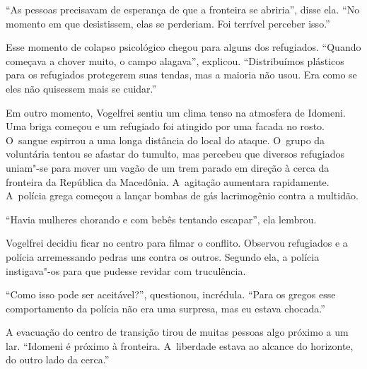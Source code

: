 ``As pessoas precisavam de esperança de que a fronteira se abriria'',
disse ela. ``No momento em que desistissem, elas se perderiam. Foi
terrível perceber isso.''

Esse momento de colapso psicológico chegou para alguns dos refugiados.
``Quando começava a chover muito, o campo alagava'', explicou.
``Distribuímos plásticos para os refugiados protegerem suas tendas, mas
a maioria não usou. Era como se eles não quisessem mais se cuidar.''

Em outro momento, Vogelfrei sentiu um clima tenso na atmosfera de
Idomeni. Uma briga começou e um refugiado foi atingido por uma facada no
rosto. O~sangue espirrou a uma longa distância do local do ataque. 
O~grupo da voluntária tentou se afastar do tumulto, mas percebeu
que diversos refugiados uniam"-se para mover um vagão de um trem parado
em direção à cerca da fronteira da República da Macedônia. A~agitação
aumentara rapidamente. A~polícia grega começou a lançar bombas de gás
lacrimogênio contra a multidão.

``Havia mulheres chorando e com bebês tentando escapar'', ela lembrou.

Vogelfrei decidiu ficar no centro para filmar o conflito. Observou
refugiados e a polícia arremessando pedras uns contra os outros. Segundo ela, a polícia instigava"-os para que pudesse revidar com truculência.

``Como isso pode ser aceitável?'', questionou, incrédula. ``Para os
gregos esse comportamento da polícia não era uma surpresa, mas eu estava
chocada.''

A evacuação do centro de transição tirou de muitas pessoas algo próximo
a um lar. ``Idomeni é próximo à fronteira. A~liberdade estava ao alcance
do horizonte, do outro lado da cerca.''
